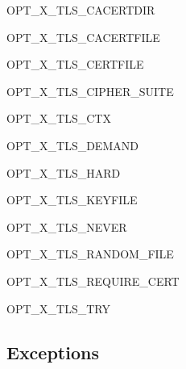 \begin{datadesc}{OPT_X_TLS_CACERTDIR}
\end{datadesc}

\begin{datadesc}{OPT_X_TLS_CACERTFILE}
\end{datadesc}

\begin{datadesc}{OPT_X_TLS_CERTFILE}
\end{datadesc}

\begin{datadesc}{OPT_X_TLS_CIPHER_SUITE}
\end{datadesc}

\begin{datadesc}{OPT_X_TLS_CTX}
\end{datadesc}

\begin{datadesc}{OPT_X_TLS_DEMAND}
\end{datadesc}

\begin{datadesc}{OPT_X_TLS_HARD}
\end{datadesc}

\begin{datadesc}{OPT_X_TLS_KEYFILE}
\end{datadesc}

\begin{datadesc}{OPT_X_TLS_NEVER}
\end{datadesc}

\begin{datadesc}{OPT_X_TLS_RANDOM_FILE}
\end{datadesc}

\begin{datadesc}{OPT_X_TLS_REQUIRE_CERT}
\end{datadesc}

\begin{datadesc}{OPT_X_TLS_TRY}
\end{datadesc}



\subsection{Exceptions}
\label{subsec:exceptfrommeth}

